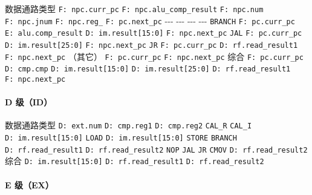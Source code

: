 \documentclass[12pt,AutoFakeBold,AutoFakeSlant]{article}
\begin{document}
数据通路类型 \textbar{} \texttt{F:\ npc.curr\_pc} \textbar{}
\texttt{F:\ npc.alu\_comp\_result} \textbar{} \texttt{F:\ npc.num}
\textbar{} \texttt{F:\ npc.jnum} \textbar{} \texttt{F:\ npc.reg\_}
\textbar{} \texttt{F:\ pc.next\_pc} -\/-\/- \textbar{} -\/-\/-
\textbar{} -\/-\/- \textbar{} -\/-\/- \texttt{BRANCH} \textbar{}
\texttt{F:\ pc.curr\_pc} \textbar{} \texttt{E:\ alu.comp\_result}
\textbar{} \texttt{D:\ im.result{[}15:0{]}} \textbar{} \textbar{}
\textbar{} \texttt{F:\ npc.next\_pc} \texttt{JAL} \textbar{}
\texttt{F:\ pc.curr\_pc} \textbar{} \textbar{} \textbar{}
\texttt{D:\ im.result{[}25:0{]}} \textbar{} \textbar{}
\texttt{F:\ npc.next\_pc} \texttt{JR} \textbar{}
\texttt{F:\ pc.curr\_pc} \textbar{} \textbar{} \textbar{} \textbar{}
\texttt{D:\ rf.read\_result1} \textbar{} \texttt{F:\ npc.next\_pc}
（其它）\textbar{} \texttt{F:\ pc.curr\_pc} \textbar{} \textbar{}
\textbar{} \textbar{} \textbar{} \texttt{F:\ npc.next\_pc} 综合
\textbar{} \texttt{F:\ pc.curr\_pc} \textbar{} \texttt{D:\ cmp.cmp}
\textbar{} \texttt{D:\ im.result{[}15:0{]}} \textbar{}
\texttt{D:\ im.result{[}25:0{]}} \textbar{}
\texttt{D:\ rf.read\_result1} \textbar{} \texttt{F:\ npc.next\_pc}

\hypertarget{d-ux7ea7id}{%
\paragraph{D 级（ID）}\label{d-ux7ea7id}}

数据通路类型 \textbar{} \texttt{D:\ ext.num} \textbar{}
\texttt{D:\ cmp.reg1} \textbar{} \texttt{D:\ cmp.reg2} \texttt{CAL\_R}
\textbar{} \textbar{} \textbar{} \texttt{CAL\_I} \textbar{}
\texttt{D:\ im.result{[}15:0{]}} \textbar{} \textbar{} \texttt{LOAD}
\textbar{} \texttt{D:\ im.result{[}15:0{]}} \textbar{} \textbar{}
\texttt{STORE} \textbar{} \textbar{} \textbar{} \texttt{BRANCH}
\textbar{} \textbar{} \texttt{D:\ rf.read\_result1} \textbar{}
\texttt{D:\ rf.read\_result2} \texttt{NOP} \textbar{} \textbar{}
\textbar{} \texttt{JAL} \textbar{} \textbar{} \textbar{} \texttt{JR}
\textbar{} \textbar{} \textbar{} \texttt{CMOV} \textbar{} \textbar{}
\texttt{D:\ rf.read\_result2} 综合 \textbar{}
\texttt{D:\ im.result{[}15:0{]}} \textbar{}
\texttt{D:\ rf.read\_result1} \textbar{} \texttt{D:\ rf.read\_result2}

\hypertarget{e-ux7ea7ex}{%
\paragraph{E 级（EX）}\label{e-ux7ea7ex}}
\end{document}

